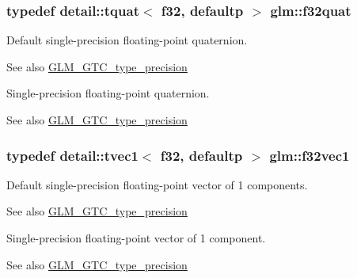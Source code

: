 \subsubsection[{\texorpdfstring{f32quat}{f32quat}}]{\setlength{\rightskip}{0pt plus 5cm}typedef detail\+::tquat$<$ f32, defaultp $>$ {\bf glm\+::f32quat}}\hypertarget{group__gtc__type__precision_gafc69e0f1b9ac1a001bb4b1b9710d4f92}{}\label{group__gtc__type__precision_gafc69e0f1b9ac1a001bb4b1b9710d4f92}
Default single-\/precision floating-\/point quaternion. \begin{DoxySeeAlso}{See also}
\hyperlink{group__gtc__type__precision}{G\+L\+M\+\_\+\+G\+T\+C\+\_\+type\+\_\+precision}
\end{DoxySeeAlso}
Single-\/precision floating-\/point quaternion. \begin{DoxySeeAlso}{See also}
\hyperlink{group__gtc__type__precision}{G\+L\+M\+\_\+\+G\+T\+C\+\_\+type\+\_\+precision} 
\end{DoxySeeAlso}
\subsubsection[{\texorpdfstring{f32vec1}{f32vec1}}]{\setlength{\rightskip}{0pt plus 5cm}typedef detail\+::tvec1$<$ f32, defaultp $>$ {\bf glm\+::f32vec1}}\hypertarget{group__gtc__type__precision_ga7335bddf7a09ba275d5d04f7681f03e6}{}\label{group__gtc__type__precision_ga7335bddf7a09ba275d5d04f7681f03e6}
Default single-\/precision floating-\/point vector of 1 components. \begin{DoxySeeAlso}{See also}
\hyperlink{group__gtc__type__precision}{G\+L\+M\+\_\+\+G\+T\+C\+\_\+type\+\_\+precision}
\end{DoxySeeAlso}
Single-\/precision floating-\/point vector of 1 component. \begin{DoxySeeAlso}{See also}
\hyperlink{group__gtc__type__precision}{G\+L\+M\+\_\+\+G\+T\+C\+\_\+type\+\_\+precision} 
\end{DoxySeeAlso}
